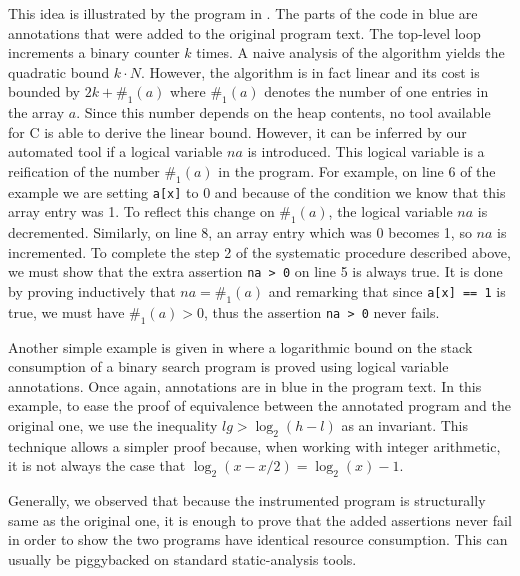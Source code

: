 \documentclass[nocopyrightspace,preprint,pldi]{sigplanconf-pldi15}
\newcommand{\pref}[1]{\prettyref{#1}}
\begin{document}
This idea is illustrated by the program in \pref{fig:xmplincaux}.
The parts of the code in blue are annotations that were added
to the original program text.  The top-level loop increments
a binary counter $k$ times.  A naive analysis of
the algorithm yields the quadratic bound $k \cdot N$.
However, the algorithm is in fact linear and its cost is bounded
by $2k + \#_1(a)$ where $\#_1(a)$ denotes
the number of one entries in the array $a$.  Since this
number depends on the heap contents, no tool available
for C is able to derive the linear bound.  However, it can be inferred
by our automated tool if a logical variable $na$ is introduced.
This logical variable is a reification of the
number $\#_1(a)$ in the program.  For example, on line 6 of the example
we are setting \lstinline{a[x]} to 0 and because of the condition we
know that this array entry was 1.  To reflect this change on
$\#_1(a)$, the logical variable $na$ is decremented.
Similarly, on line 8, an array entry which was 0 becomes 1, so
$na$ is incremented.  To complete the step 2 of the systematic
procedure described above, we must show that the extra assertion
\lstinline{na > 0} on line 5 is always true.  It
is done by proving inductively that $na = \#_1(a)$
and remarking that since \lstinline{a[x] == 1} is true, we must have
$\#_1(a) > 0$, thus the assertion \lstinline{na > 0} never fails.

Another simple example is given in \pref{fig:xmplbsaux} where
a logarithmic bound on the stack consumption of a binary search
program is proved using logical variable annotations.  Once again,
annotations are in blue in the program text.  In this example,
to ease the proof of equivalence between the annotated program
and the original one, we use the inequality $lg >
\log_2(h-l)$ as an invariant.  This technique allows a simpler
proof because, when working with integer arithmetic, it is not always
the case that $\log_2(x-x/2) = \log_2(x)-1$.

Generally, we observed that because the instrumented program
is structurally same as the original one, it is enough to prove
that the added assertions never fail in order to show the two programs
have identical resource consumption.  This can usually be piggybacked
on standard static-analysis tools.
\end{document}
